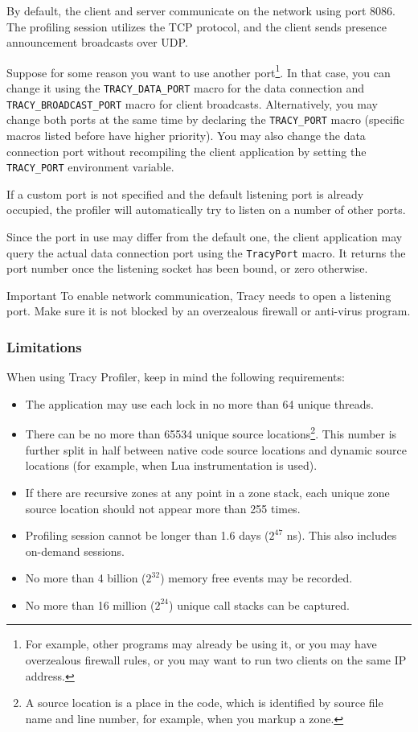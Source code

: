 \documentclass[hidelinks,titlepage,a4paper,twoside]{article}
\begin{document}
By default, the client and server communicate on the network using port 8086. The profiling session utilizes the TCP protocol, and the client sends presence announcement broadcasts over UDP.

Suppose for some reason you want to use another port\footnote{For example, other programs may already be using it, or you may have overzealous firewall rules, or you may want to run two clients on the same IP address.}. In that case, you can change it using the \texttt{TRACY\_DATA\_PORT} macro for the data connection and \texttt{TRACY\_BROADCAST\_PORT} macro for client broadcasts. Alternatively, you may change both ports at the same time by declaring the \texttt{TRACY\_PORT} macro (specific macros listed before have higher priority). You may also change the data connection port without recompiling the client application by setting the \texttt{TRACY\_PORT} environment variable.

If a custom port is not specified and the default listening port is already occupied, the profiler will automatically try to listen on a number of other ports.

Since the port in use may differ from the default one, the client application may query the actual data connection port using the \texttt{TracyPort} macro. It returns the port number once the listening socket has been bound, or zero otherwise.

\begin{bclogo}[
noborder=true,
couleur=black!5,
logo=\bcbombe
]{Important}
To enable network communication, Tracy needs to open a listening port. Make sure it is not blocked by an overzealous firewall or anti-virus program.
\end{bclogo}

\subsubsection{Limitations}

When using Tracy Profiler, keep in mind the following requirements:

\begin{itemize}
\item The application may use each lock in no more than 64 unique threads.
\item There can be no more than 65534 unique source locations\footnote{A source location is a place in the code, which is identified by source file name and line number, for example, when you markup a zone.}. This number is further split in half between native code source locations and dynamic source locations (for example, when Lua instrumentation is used).
\item If there are recursive zones at any point in a zone stack, each unique zone source location should not appear more than 255 times.
\item Profiling session cannot be longer than 1.6 days ($2^{47}$ \si{\nano\second}). This also includes on-demand sessions.
\item No more than 4 billion ($2^{32}$) memory free events may be recorded.
\item No more than 16 million ($2^{24}$) unique call stacks can be captured.
\end{itemize}
\end{document}
